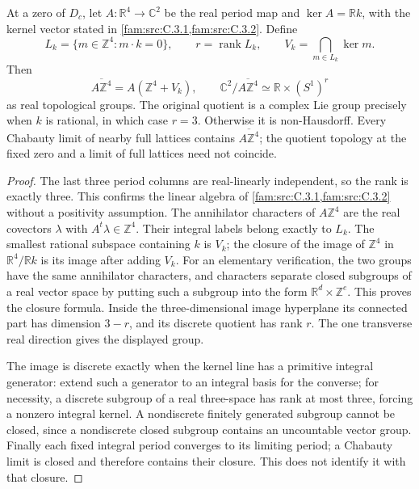 \begin{proposition}\label{push:src:D.4.3}
At a zero of \(D_c\), let \(A:\mathbb R^4\to\mathbb C^2\) be
the real period map and \(\ker A=\mathbb R k\), with the kernel
vector stated in \cref{fam:src:C.3.1,fam:src:C.3.2}. Define
\[
 L_k=\{m\in\mathbb Z^4:m\cdot k=0\},\qquad r=\operatorname{rank}L_k,
 \qquad V_k=\bigcap_{m\in L_k}\ker m.
\]
Then
\[
 \overline{A\mathbb Z^4}=A(\mathbb Z^4+V_k),\qquad
 \mathbb C^2/\overline{A\mathbb Z^4}\simeq
                         \mathbb R\times(S^1)^r
\]
as real topological groups. The original quotient is a complex Lie
group precisely when \(k\) is rational, in which case \(r=3\).
Otherwise it is non-Hausdorff. Every Chabauty limit of nearby full
lattices contains \(\overline{A\mathbb Z^4}\); the quotient topology
at the fixed zero and a limit of full lattices need not coincide.
\end{proposition}

\begin{proof}
The last three period columns are real-linearly independent, so the
rank is exactly three. This confirms the linear algebra of \cref{fam:src:C.3.1,fam:src:C.3.2}
without a positivity assumption. The annihilator characters of
\(A\mathbb Z^4\) are the real covectors \(\lambda\) with
\(A^t\lambda\in\mathbb Z^4\). Their integral labels belong exactly
to \(L_k\). The smallest rational subspace containing \(k\) is
\(V_k\); the closure of the image of \(\mathbb Z^4\) in
\(\mathbb R^4/\mathbb R k\) is its image after adding \(V_k\).
For an elementary verification, the two groups have the same
annihilator characters, and characters separate closed subgroups of
a real vector space by putting such a subgroup into the form
\(\mathbb R^d\times\mathbb Z^e\). This proves the closure formula.
Inside the three-dimensional image hyperplane its connected part
has dimension \(3-r\), and its discrete quotient has rank \(r\).
The one transverse real direction gives the displayed group.

The image is discrete exactly when the kernel line has a primitive
integral generator: extend such a generator to an integral basis for
the converse; for necessity, a discrete subgroup of a real
three-space has rank at most three, forcing a nonzero integral
kernel. A nondiscrete finitely generated subgroup cannot be closed,
since a nondiscrete closed subgroup contains an uncountable vector
group. Finally each fixed integral period converges to its limiting
period; a Chabauty limit is closed and therefore contains their
closure. This does not identify it with that closure.
\end{proof}

